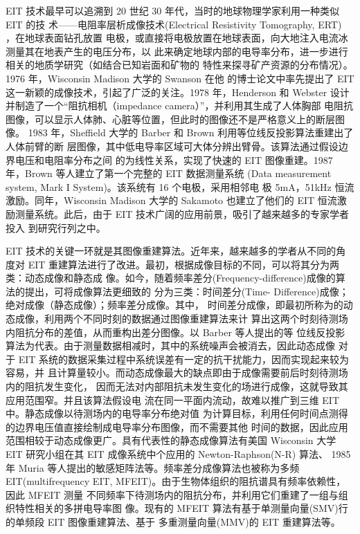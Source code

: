 
EIT 技术最早可以追溯到 20 世纪 30 年代，当时的地球物理学家利用一种类似 EIT 的技
术——电阻率层析成像技术(Electrical Resistivity Tomography, ERT) ，在地球表面钻孔放置
电极，或直接将电极放置在地球表面，向大地注入电流冰测量其在地表产生的电压分布，以
此来确定地球内部的电导率分布，进一步进行相关的地质学研究（如结合已知岩面和矿物的
特性来探寻矿产资源的分布情况）\cite{1999Pottery}。1976 年，Wisconsin Madison 大学的 Swanson 在他
的博士论文中率先提出了 EIT 这一新颖的成像技术，引起了广泛的关注。1978 年，Henderson
和 Webster 设计并制造了一个“阻抗相机（impedance camera）”，并利用其生成了人体胸部
电阻抗图像，可以显示人体肺、心脏等位置，但此时的图像还不是严格意义上的断层图像\cite{2007An}。
1983 年，Sheffield 大学的 Barber 和 Brown 利用等位线反投影算法重建出了人体前臂的断
层图像，其中低电导率区域可大体分辨出臂骨。该算法通过假设边界电压和电阻率分布之间
的为线性关系，实现了快速的 EIT 图像重建。1987 年，Brown 等人建立了第一个完整的 EIT
数据测量系统\cite{1987Electrical} (Data measurement system, Mark I System)。该系统有 16 个电极，采用相邻电
极 5mA，51kHz 恒流激励。同年，Wisconsin Madison 大学的 Sakamoto 也建立了他们的 EIT
恒流激励测量系统。此后，由于 EIT 技术广阔的应用前景，吸引了越来越多的专家学者投入
到研究行列之中。

EIT 技术的关键一环就是其图像重建算法。近年来，越来越多的学者从不同的角度对 EIT
重建算法进行了改进。最初，根据成像目标的不同，可以将其分为两类：动态成像和静态成
像。如今，随着频率差分(Frequency-difference)成像的算法的提出，可将成像算法更细致的
分为三类：时间差分(Time- Difference)成像；绝对成像（静态成像）；频率差分成像。其中，
时间差分成像，即最初所称为的动态成像，利用两个不同时刻的数据通过图像重建算法来计
算出这两个时刻待测场内阻抗分布的差值，从而重构出差分图像。以 Barber 等人提出的等
位线反投影算法为代表。由于测量数据相减时，其中的系统噪声会被消去，因此动态成像
对于 EIT 系统的数据采集过程中系统误差有一定的抗干扰能力，因而实现起来较为容易，并
且计算量较小。而动态成像最大的缺点即由于成像需要前后时刻待测场内的阻抗发生变化，
因而无法对内部阻抗未发生变化的场进行成像，这就导致其应用范围窄。并且该算法假设电
流在同一平面内流动，故难以推广到三维 EIT 中。静态成像以待测场内的电导率分布绝对值
为计算目标，利用任何时间点测得的边界电压值直接绘制成电导率分布图像，而不需要其他
时间的数据，因此应用范围相较于动态成像更广。具有代表性的静态成像算法有美国
Wisconsin 大学 EIT 研究小组在其 EIT 成像系统中个应用的 Newton-Raphson(N-R) 算法、
1985 年 Muria 等人提出的敏感矩阵法等。频率差分成像算法也被称为多频
EIT(multifrequency EIT, MFEIT)。由于生物体组织的阻抗谱具有频率依赖性，因此 MFEIT 测量
不同频率下待测场内的阻抗分布，并利用它们重建了一组与组织特性相关的多拼电导率图
像。现有的 MFEIT 算法有基于单测量向量(SMV)行的单频段 EIT 图像重建算法\cite{AreconsAlg}\cite{7932511}\cite{2018Image}、基于
多重测量向量(MMV)的 EIT 重建算法\cite{9732193}等。

